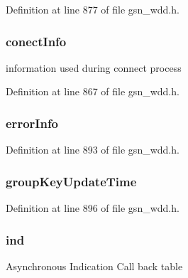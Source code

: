 Definition at line 877 of file gsn\_\-wdd.h.

\hypertarget{a00108_ad5c6e8d12ebc9a7497ba35d144a5f19f}{
\subsubsection[{conectInfo}]{ {\bf conectInfo}}}
\label{a00108_ad5c6e8d12ebc9a7497ba35d144a5f19f}
information used during connect process 

Definition at line 867 of file gsn\_\-wdd.h.

\hypertarget{a00108_a793f4df4f0aeaae2a47d5f241c58888c}{
\subsubsection[{errorInfo}]{ {\bf errorInfo}}}
\label{a00108_a793f4df4f0aeaae2a47d5f241c58888c}


Definition at line 893 of file gsn\_\-wdd.h.

\hypertarget{a00108_adc9045c1c06adcde56a323e42f827f57}{
\subsubsection[{groupKeyUpdateTime}]{ {\bf groupKeyUpdateTime}}}
\label{a00108_adc9045c1c06adcde56a323e42f827f57}


Definition at line 896 of file gsn\_\-wdd.h.

\hypertarget{a00108_aa08a8fd32e70140a0683e87a5e2ce284}{
\subsubsection[{ind}]{ {\bf ind}}}
\label{a00108_aa08a8fd32e70140a0683e87a5e2ce284}
Asynchronous Indication Call back table 

